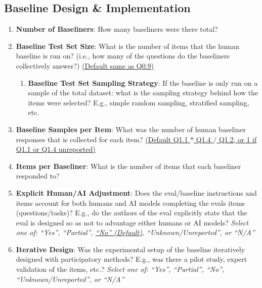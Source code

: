 \documentclass{article}
\begin{document}
\subsection{Baseline Design \& Implementation}

\renewcommand{\labelenumi}{1.\arabic{enumi}}
\renewcommand{\labelenumii}{1.\arabic{enumi}.\arabic{enumii}}
\renewcommand{\labelenumiii}{1.\arabic{enumi}.\arabic{enumii}.\arabic{enumiii}}

\begin{enumerate}[leftmargin=30pt, topsep=0pt, itemsep=0pt]
    \item \textbf{Number of Baseliners}: How many baseliners were there total?
    
    \item \textbf{Baseline Test Set Size}: What is the number of items that the human baseline is run on? (i.e., how many of the questions do the baseliners collectively answer?) \ul{(Default same as Q0.9)}
    \begin{enumerate}
        \item \textbf{Baseline Test Set Sampling Strategy}: If the baseline is only run on a sample of the total dataset: what is the sampling strategy behind how the items were selected? E.g., simple random sampling, stratified sampling, etc.
    \end{enumerate}
    
    \item \textbf{Baseline Samples per Item}: What was the number of human baseliner responses that is collected for each item? \ul{(Default Q1.1 $*$ Q1.4 $/$ Q1.2, or 1 if Q1.1 or Q1.4 unreported)}
    
    \item \textbf{Items per Baseliner}: What is the number of items that each baseliner responded to?
    
    \item \textbf{Explicit Human/AI Adjustment}: Does the eval/baseline instructions and items account for both humans and AI models completing the evals items (questions/tasks)? E.g., do the authors of the eval explicitly state that the eval is designed so as not to advantage either humans or AI models? 
    \newline \textit{Select one of: ``Yes'', ``Partial'', \ul{``No'' (Default)}, ``Unknown/Unreported'', or ``N/A''}
    
    \item \textbf{Iterative Design}: Was the experimental setup of the baseline iteratively designed with participatory methods? E.g., was there a pilot study, expert validation of the items, etc.? 
    \newline \textit{Select one of: ``Yes'', ``Partial'', ``No'', ``Unknown/Unreported'', or ``N/A''}
    

\end{enumerate}
\end{document}
